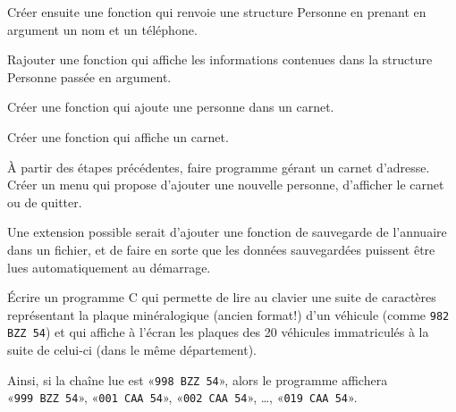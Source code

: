 \documentclass[10pt]{article}\usepackage[correction,nu]{esial}
\begin{document}
\Question Créer ensuite une fonction qui renvoie une structure Personne en
prenant en argument un nom et un téléphone.

\Question Rajouter une fonction qui affiche les informations contenues dans la
structure Personne passée en argument.

\Question Créer une fonction qui ajoute une personne dans un carnet.

\Question Créer une fonction qui affiche un carnet.

\Question À partir des étapes précédentes, faire programme gérant un carnet
d'adresse. Créer un menu qui propose d'ajouter une nouvelle personne,
d'afficher le carnet ou de quitter.

\medskip
Une extension possible serait d'ajouter une fonction de sauvegarde de
l'annuaire dans un fichier, et de faire en sorte que les données sauvegardées
puissent être lues automatiquement au démarrage. 

\bigskip\bigskip\Exercice

Écrire un programme C qui permette de lire au clavier une suite de
caractères représentant la plaque minéralogique (ancien format!) d'un véhicule
(comme \texttt{982 BZZ 54}) et qui affiche à l'écran les plaques des 20
véhicules immatriculés à la suite de celui-ci (dans le même département).

Ainsi, si la chaîne lue est «{\tt 998 BZZ 54}», alors le programme affichera\\
«{\tt 999 BZZ 54}», «{\tt 001 CAA 54}», «{\tt 002 CAA 54}», \dots,  
«{\tt 019 CAA 54}».
\end{document}
